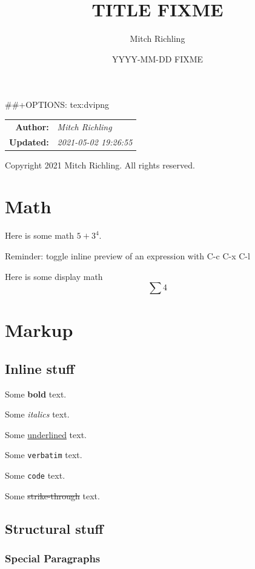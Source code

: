 \documentclass[11pt]{article}
\author{Mitch Richling}
\date{YYYY-MM-DD FIXME}
\title{TITLE FIXME}
\begin{document}
\maketitle
\#\#+OPTIONS:     tex:dvipng

\begin{center}
\begin{tabular}{rl}
\textbf{Author:} & \emph{Mitch Richling}\\
\textbf{Updated:} & \emph{2021-05-02 19:26:55}\\
\end{tabular}
\end{center}
Copyright 2021 Mitch Richling. All rights reserved.

\setcounter{tocdepth}{5}
\tableofcontents

\section{Math}
\label{sec:org8762dac}

Here is some math \(5+3^4\).

Reminder: toggle inline preview of an expression with C-c C-x C-l

Here is some display math $$\sum 4$$

\section{Markup}
\label{sec:org5e2966a}

\subsection{Inline stuff}
\label{sec:org60c30e2}

Some \textbf{bold} text.

Some \emph{italics} text.

Some \uline{underlined} text.

Some \texttt{verbatim} text.

Some \texttt{code} text.

Some \sout{strike-through} text.

\subsection{Structural stuff}
\label{sec:org05b3e95}

\subsubsection{Special Paragraphs}
\label{sec:orgb723828}
\end{document}
